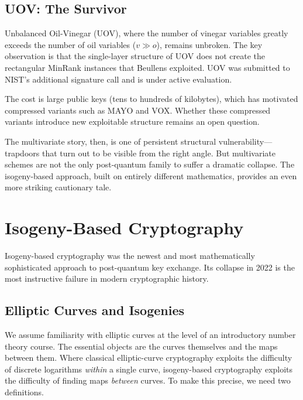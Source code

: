\subsection{UOV: The Survivor}
\label{subsec:uov}

Unbalanced Oil-Vinegar (UOV), where the number of vinegar variables greatly exceeds the number of oil variables ($v \gg o$), remains unbroken.  The key observation is that the single-layer structure of UOV does not create the rectangular MinRank instances that Beullens exploited.  UOV was submitted to NIST's additional signature call and is under active evaluation.

The cost is large public keys (tens to hundreds of kilobytes), which has motivated compressed variants such as MAYO and VOX.  Whether these compressed variants introduce new exploitable structure remains an open question.

The multivariate story, then, is one of persistent structural vulnerability---trapdoors that turn out to be visible from the right angle.  But multivariate schemes are not the only post-quantum family to suffer a dramatic collapse.  The isogeny-based approach, built on entirely different mathematics, provides an even more striking cautionary tale.


\section{Isogeny-Based Cryptography}
\label{sec:isogenies}

Isogeny-based cryptography was the newest and most mathematically sophisticated approach to post-quantum key exchange.  Its collapse in 2022 is the most instructive failure in modern cryptographic history.

\subsection{Elliptic Curves and Isogenies}
\label{subsec:ec-isogenies}

We assume familiarity with elliptic curves at the level of an introductory number theory course.  The essential objects are the curves themselves and the maps between them.  Where classical elliptic-curve cryptography exploits the difficulty of discrete logarithms \emph{within} a single curve, isogeny-based cryptography exploits the difficulty of finding maps \emph{between} curves.  To make this precise, we need two definitions.

